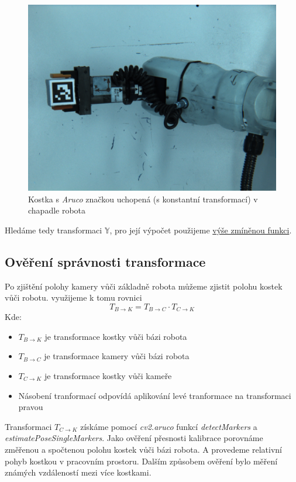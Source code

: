 \documentclass[journal,twoside,web]{ieeecolor}
\begin{document}
\begin{figure}[h!]
    \centering
    \includegraphics[width=0.8\linewidth]{images/Hand2eye.png}
    \caption{Kostka s \textit{Aruco} značkou uchopená (s konstantní transformací) v chapadle robota}
    \label{fig:ArucoInHand}
\end{figure}
Hledáme tedy transformaci $\mathbb{Y}$, pro její výpočet použijeme \hyperlink{cv2Handeye}{výše zmíněnou funkci}.

\subsection{Ověření správnosti transformace}
Po zjištění polohy kamery vůči základně robota můžeme zjistit polohu kostek vůči robotu. využijeme
k tomu rovnici
\begin{equation}
    T_{B\rightarrow K} = T_{B\rightarrow C} \cdot T_{C \rightarrow K}
\end{equation}
Kde:
\begin{itemize}
    \item $T_{B\rightarrow K}$ je transformace kostky vůči bázi robota\\
    \item $T_{B\rightarrow C}$ je transformace kamery vůči bázi robota\\
    \item $T_{C\rightarrow K}$ je transformace kostky vůči kameře\\
    \item Násobení tranformací odpovídá aplikování levé tranformace na transformaci pravou
\end{itemize}
Transformaci $T_{C\rightarrow K}$ získáme pomocí \textit{cv2.aruco} funkcí \textit{detectMarkers} a
\textit{estimatePoseSingleMarkers}. Jako ověření přesnosti kalibrace porovnáme změřenou a spočtenou
polohu kostek vůči bázi robota. A provedeme relativní pohyb kostkou v pracovním prostoru.
Dalším způsobem ověření bylo měření známých vzdáleností mezi více kostkami. %
\end{document}

